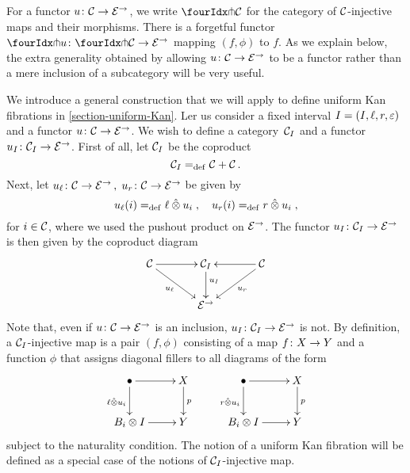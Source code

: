\documentclass[reqno,10pt,a4paper,oneside]{amsart}
\begin{document}
For a functor $u \co \cal{C} \to \catE^\to$, we write $\liftr{\cal{C}}$ for the category  of 
$\cal{C}$-injective maps and their morphisms. There is a forgetful functor~$\liftr{u} \co \liftr{\cal{C}} \to \catE^\to$
mapping $(f, \phi)$ to $f$. As we explain below, the extra generality obtained by allowing $u \co \cal{C} \to \catE^\to$ to be a functor rather than a mere inclusion of a  subcategory will be very useful.

\medskip

We introduce a general construction that we will apply to define uniform Kan fibrations in \cref{section-uniform-Kan}.
Ler us consider a fixed interval $\interval = (\interval, \intervall, \intervalr, \varepsilon)$ and a functor $u \co \cal{C} \to \catE^\to$. We wish to define a category~$\cal{C}_\interval$ and a functor $u_\interval \co \cal{C}_\interval \to \catE^\to$. First of all, let $\cal{C}_\interval$ be the coproduct
 \[
 \cal{C}_\interval  \defeq \cal{C} + \cal{C} \, .
 \] 
 Next, let $u_{\intervall} \co \cal{C} \to \catE^\to \, , \; u_{\intervalr} \co \cal{C} \to \catE^\to$ be given by
 \[
u_{\intervall}(i) \defeq  \intervall \hatotimes u_i \; , \quad
u_{\intervalr}(i) \defeq  \intervalr \hatotimes u_i \; , 
\]
for $i \in \cal{C}$, where we used the pushout product on $\catE^\to$. The functor $u_\interval \co \cal{C}_\interval \to \catE^\to$ is then given by the coproduct diagram
\begin{equation}
\label{equ:u-interval}
\vcenter{\hbox{\xymatrix@C=1.2cm{
\cal{C} \ar[r] \ar[dr]_-{u_\intervall} & \cal{C}_\interval \ar[d]^(.4){u_\interval} & \cal{C} \ar[dl]^-{u_\intervalr} \ar[l] \\ 
 & \catE^\to }}}
\end{equation}
Note that, even if $u \co \cal{C} \to \catE^\to$ is an inclusion, $u_\interval \co \cal{C}_\interval \to \catE^\to$ is not.
By definition, a $\cal{C}_\interval$-injective map is a pair $(f, \phi)$ consisting of a map $f \co X \to Y$ and a function $\phi$ that assigns diagonal fillers to all diagrams of the form
\[
\xymatrix{
\bullet \ar[r] \ar[d]_{\intervall \hatotimes u_i} & X \ar[d]^p \\
B_i \otimes \interval \ar[r] & Y} \qquad \xymatrix{
\bullet \ar[r] \ar[d]_{\intervalr \hatotimes u_i} & X \ar[d]^p \\
B_i \otimes \interval \ar[r] & Y}
\]
subject to the naturality condition. The notion of a uniform Kan fibration will be defined as
a special case of the notions of $\cal{C}_\interval$-injective map. 
  
\end{document}
